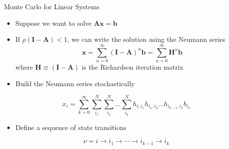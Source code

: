 \documentclass{beamer}
\begin{document}
\begin{frame}{Monte Carlo for Linear Systems}
  \begin{itemize}
    \item Suppose we want to solve $\mathbf{Ax}=\mathbf{b}$
    \vfill
    \item If $\rho(\mathbf{I-A})<1$, we can write the solution using the
      Neumann series
      \begin{equation*}
        \mathbf{x} = \sum_{n=0}^{\infty} (\mathbf{I-A})^n \mathbf{b}
         = \sum_{n=0}^{\infty} \mathbf{H}^n \mathbf{b}
      \end{equation*}
      where $\mathbf{H} \equiv ( \mathbf{I-A} )$ is the Richardson
      iteration matrix 
      \vfill
    \item Build the Neumann series stochastically
  \end{itemize}

  \[
  x_i = \sum_{k=0}^{\infty}\sum_{i_1}^{N}\sum_{i_2}^{N}\ldots
  \sum_{i_k}^{N}h_{i,i_1}h_{i_1,i_2}\ldots h_{i_{k-1},i_k}b_{i_k}
  \]

  \begin{itemize}
  \item Define a sequence of state transitions
  \end{itemize}
  \vspace*{-0.1in}
  \[
  \nu = i \rightarrow i_1 \rightarrow \cdots \rightarrow i_{k-1}
  \rightarrow i_{k}
  \]

\end{frame}
\end{document}
